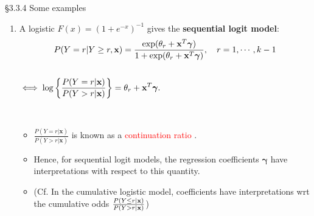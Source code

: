 \documentclass{beamer}
\newenvironment{wideitemize}%
  {\begin{itemize}%
    \setlength{\parskip}{1em}}%
  {\end{itemize}}
\begin{document}
\begin{frame}{\S3.3.4 Some examples}
%

\begin{enumerate}
\item
A logistic $F(x)=(1+e^{-x})^{-1}$ gives the \textbf{sequential logit model}:
$$P(Y=r|Y\geq r, \textbf{x})=\frac{\exp(\theta_r+\textbf{x}^T\mbox{\boldmath $\gamma$})}{1+
\exp(\theta_r+\textbf{x}^T\mbox{\boldmath $\gamma$})}, \quad r=1,\cdots, k - 1$$ \\
 $ \iff \displaystyle \log\left\{\frac{P(Y=r|\textbf{x})}{P(Y>r|\textbf{x})}\right\}=
\theta_r+\textbf{x}^T\mbox{\boldmath $\gamma$}.$

\ \

\begin{wideitemize}
\item $\frac{P(Y=r|\textbf{x})}{P(Y>r|\textbf{x})}$ is known as a \textcolor{red}{continuation ratio} \cite{tutz2012}. 

\item Hence, for sequential logit models, the regression coefficients $\boldsymbol \gamma$ have interpretations with respect to this quantity. 
\item (Cf. In the cumulative logistic model, coefficients have interpretations wrt the cumulative odds $\frac{P(Y \leq r | {\bf x})}{P(Y>r|\textbf{x})}$)
\end{wideitemize}
\end{enumerate}
\end{frame}
\end{document}
